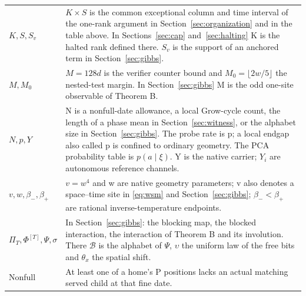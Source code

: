 \begin{longtable}{@{}>{\raggedright\arraybackslash}p{.28\linewidth}>{\raggedright\arraybackslash}p{.64\linewidth}@{}}
\(K,S,S_v\) & \(K\times S\) is the common exceptional column and time interval of the one-rank argument in Section~\ref{sec:organization} and in the table above. In Sections~\ref{sec:cap} and~\ref{sec:halting} K is the halted rank defined there. \(S_v\) is the support of an anchored term in Section~\ref{sec:gibbs}. \\
\(M,M_0\) & \(M=128d\) is the verifier counter bound and \(M_0=\lfloor2w/5\rfloor\) the nested-test margin. In Section~\ref{sec:gibbs} M is the odd one-site observable of Theorem B. \\
\(N,p,Y\) & N is a nonfull-date allowance, a local Grow-cycle count, the length of a phase mean in Section~\ref{sec:witness}, or the alphabet size in Section~\ref{sec:gibbs}. The probe rate is p; a local endgap also called p is confined to ordinary geometry. The PCA probability table is \(p(a\mid\xi)\). Y is the native carrier; \(Y_i\) are autonomous reference channels. \\
\(v,w,\beta_-,\beta_+\) & \(v=w^4\) and w are native geometry parameters; v also denotes a space--time site in \eqref{eq:wsm} and Section~\ref{sec:gibbs}; \(\beta_-<\beta_+\) are rational inverse-temperature endpoints. \\
\(\Pi_T,\Phi^{[T]},\Psi,\sigma\) & In Section~\ref{sec:gibbs}: the blocking map, the blocked interaction, the interaction of Theorem B and its involution. There \(\mathcal B\) is the alphabet of \(\Psi\), \(\upsilon\) the uniform law of the free bits and \(\theta_x\) the spatial shift. \\
Nonfull & At least one of a home's P positions lacks an actual matching served child at that fine date. \\
\bottomrule
\end{longtable}




